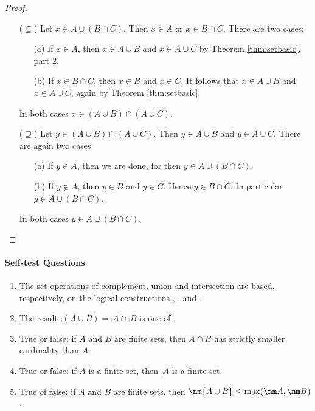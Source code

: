 \begin{proof}
\begin{itemize}
  \item[($\subseteq$)] Let $x\in A\cup (B\cap C)$. Then $x\in A$ or $x\in B\cap C$. There are two cases:
  \begin{itemize}
    \item[(a)] If $x\in A$, then $x\in A\cup B$ and $x\in A\cup C$ by Theorem \ref{thm:setbasic}, part 2.
    \item[(b)] If $x\in B\cap C$, then $x\in B$ and $x\in C$. It follows that $x\in A\cup B$ and $x\in A\cup C$, again by Theorem \ref{thm:setbasic}.
  \end{itemize}
  In both cases $x\in (A\cup B)\cap(A\cup C)$.
  \item[($\supseteq$)] Let $y\in (A\cup B)\cap(A\cup C)$. Then $y\in A\cup B$ and $y\in A\cup C$. There are again two cases:
  \begin{itemize}
    \item[(a)] If $y\in A$, then we are done, for then $y\in A\cup (B\cap C)$.
    \item[(b)] If $y\notin A$, then $y\in B$ and $y\in C$. Hence $y\in B\cap C$. In particular $y\in A\cup (B\cap C)$.
  \end{itemize}
  In both cases $y\in A\cup (B\cap C)$.\qedhere
\end{itemize}
\end{proof}

\paragraph{Self-test Questions}

\begin{enumerate}
  \item The set operations of complement, union and intersection are based, respectively, on the logical constructions \underline{\phantom{not\quad}}, \underline{\phantom{or\quad}}, and \underline{\phantom{and\quad}}.
  \item The result $\comp{(A\cup B)}=\comp A\cap\comp B$ is one of \underline{\phantom{De Morgan's laws\qquad}}.
  \item True or false: if $A$ and $B$ are finite sets, then $A\cap B$ has strictly smaller cardinality than $A$.
  \item True or false: if $A$ is a finite set, then $\comp A$ is a finite set.
  \item True of false: if $A$ and $B$ are finite sets, then $\nm{A\cup B}\le\max(\nm A,\nm B)$.
\end{enumerate}

